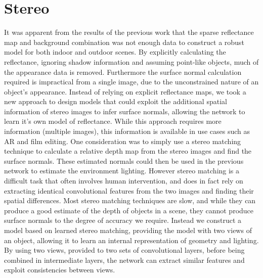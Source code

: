 \documentclass[ %
                    author={Gavin Parker},
                supervisor={Dr. Neill Campbell},
                    degree={MEng},
                     title={Deep Siamese Networks for Illumination Estimation from Stereo Images},
                  subtitle={},
                      type={research},
                      year={2018} ]{dissertation}
\begin{document}
\section{Stereo}
It was apparent from the results of the previous work that the sparse reflectance map and background combination was not enough data to construct a robust model for both indoor and outdoor scenes. By explicitly calculating the reflectance, ignoring shadow information and assuming point-like objects, much of the appearance data is removed. Furthermore the surface normal calculation required is impractical from a single image, due to the unconstrained nature of an object's appearance. Instead of relying on explicit reflectance maps, we took a new approach to design models that could exploit the additional spatial information of stereo images to infer surface normals, allowing the network to learn it's own model of reflectance. While this approach requires more information (multiple images), this information is available in use cases such as AR and film editing. One consideration was to simply use a stereo matching technique to calculate a relative depth map from the stereo images and find the surface normals. These estimated normals could then be used in the previous network to estimate the environment lighting. However stereo matching is a difficult task that often involves human intervention, and does in fact rely on extracting identical convolutional features from the two images and finding their spatial differences. Most stereo matching techniques are slow, and while they can produce a good estimate of the depth of objects in a scene, they cannot produce surface normals to the degree of accuracy we require. Instead we construct a model based on learned stereo matching, providing the model with two views of an object, allowing it to learn an internal representation of geometry and lighting. By using two views, provided to two sets of convolutional layers, before being combined in intermediate layers, the network can extract similar features and exploit consistencies between views.
\end{document}
